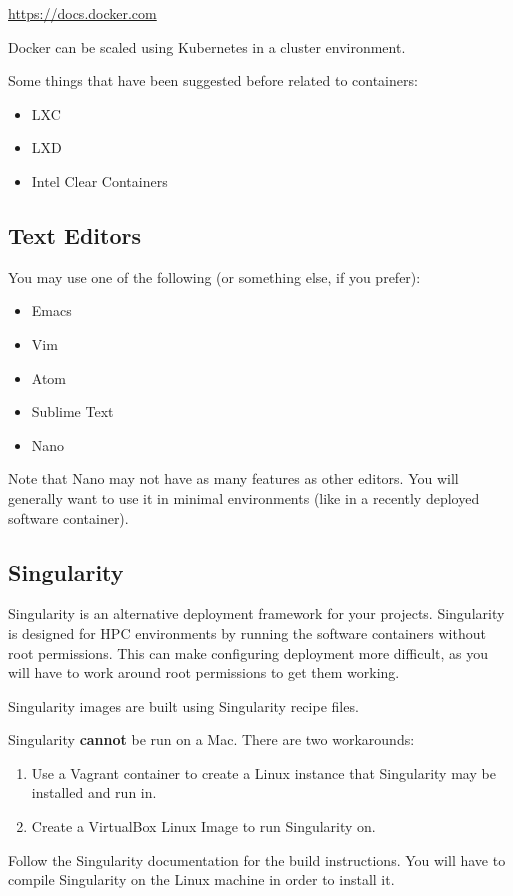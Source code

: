 \documentclass{article}
\begin{document}
\url{https://docs.docker.com}

Docker can be scaled using Kubernetes in a cluster environment.

Some things that have been suggested before related to containers:

\begin{itemize}
\item LXC
\item LXD
\item Intel Clear Containers
\end{itemize}

\subsection{Text Editors}
 
You may use one of the following (or something else, if you prefer):

\begin{itemize}
\item Emacs
\item Vim
\item Atom
\item Sublime Text
\item Nano
\end{itemize}

Note that Nano may not have as many features as other editors.
You will generally want to use it in minimal environments 
(like in a recently deployed software container).

\subsection{Singularity}

Singularity is an alternative deployment framework for your projects.
Singularity is designed for HPC environments by running the 
software containers without root permissions. 
This can make configuring deployment more difficult, as
you will have to work around root permissions to get them working.

Singularity images are built using Singularity recipe files.

Singularity \textbf{cannot} be run on a Mac.
There are two workarounds:
\begin{enumerate}
\item Use a Vagrant container to create a Linux instance that Singularity may be installed  and run in.
\item Create a VirtualBox Linux Image to run Singularity on.
\end{enumerate}
Follow the Singularity documentation for the build instructions.
You will have to compile Singularity on the Linux machine
in order to install it.
\end{document}
